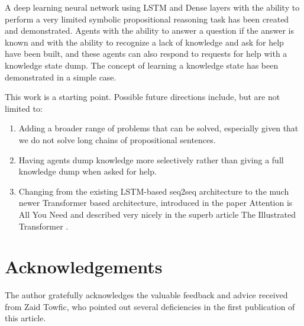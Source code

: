 \documentclass{article}
\begin{document}
A deep learning neural network using LSTM and Dense layers with the ability to perform a very limited symbolic propositional reasoning task has been created and demonstrated. Agents with the ability to answer a question if the answer is known and with the ability to recognize a lack of knowledge and ask for help have been built, and these agents can also respond to requests for help with a knowledge state dump. The concept of learning a knowledge state has been demonstrated in a simple case.

This work is a starting point. Possible future directions include, but are not limited to:

\begin{enumerate}
	\item Adding a broader range of problems that can be solved, especially given that we do not solve long chains of propositional sentences.
	\item Having agents dump knowledge more selectively rather than giving a full knowledge dump when asked for help.
	\item Changing from the existing LSTM-based seq2seq architecture to the much newer Transformer based architecture, introduced in the paper Attention is All You Need \cite{attention_is_all_you_need} and described very nicely in the superb article The Illustrated Transformer \cite{transformer}.
\end{enumerate}

\section{Acknowledgements}

The author gratefully acknowledges the valuable feedback and advice received from Zaid Towfic, who pointed out several deficiencies in the first publication of this article.




\end{document}
